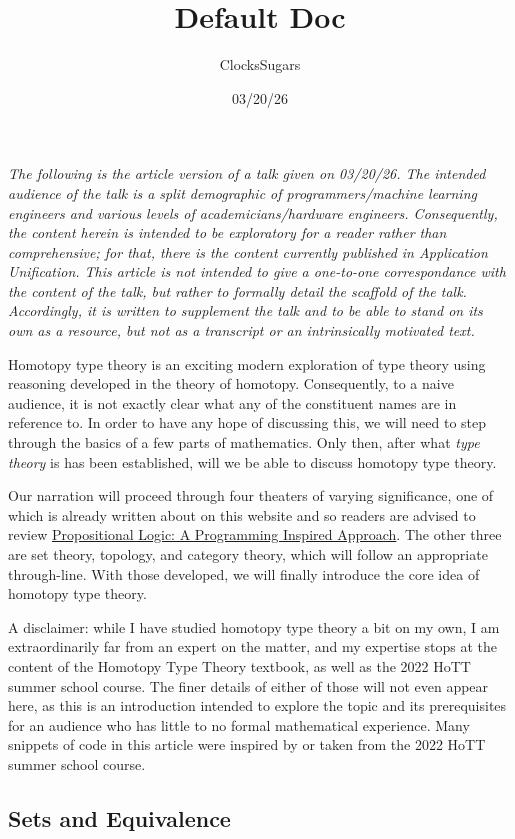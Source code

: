 \documentclass[11pt]{article}
\title{\textbf{Default Doc}}
\author{ClocksSugars}
\date{03/20/26}
\begin{document}
\emph{The following is the article version of a talk given on 03/20/26. The intended audience of the talk is a split demographic of programmers/machine learning engineers and various levels of academicians/hardware engineers. Consequently, the content herein is intended to be exploratory for a reader rather than comprehensive; for that, there is the content currently published in Application Unification. This article is not intended to give a one-to-one correspondance with the content of the talk, but rather to formally detail the scaffold of the talk. Accordingly, it is written to supplement the talk and to be able to stand on its own as a resource, but not as a transcript or an intrinsically motivated text.}

Homotopy type theory is an exciting modern exploration of type theory using reasoning developed in the theory of homotopy. Consequently, to a naive audience, it is not exactly clear what any of the constituent names are in reference to. In order to have any hope of discussing this, we will need to step through the basics of a few parts of mathematics. Only then, after what \emph{type theory} is has been established, will we be able to discuss homotopy type theory.

Our narration will proceed through four theaters of varying significance, one of which is already written about on this website and so readers are advised to review \hyperlink{https://clockssugars.blog/appliuni/prelims/proptypes.html}{Propositional Logic: A Programming Inspired Approach}. The other three are set theory, topology, and category theory, which will follow an appropriate through-line. With those developed, we will finally introduce the core idea of homotopy type theory.

A disclaimer: while I have studied homotopy type theory a bit on my own, I am extraordinarily far from an expert on the matter, and my expertise stops at the content of the Homotopy Type Theory textbook, as well as the 2022 HoTT summer school course. The finer details of either of those will not even appear here, as this is an introduction intended to explore the topic and its prerequisites for an audience who has little to no formal mathematical experience. Many snippets of code in this article were inspired by or taken from the 2022 HoTT summer school course.

\subsection{Sets and Equivalence}
\end{document}
